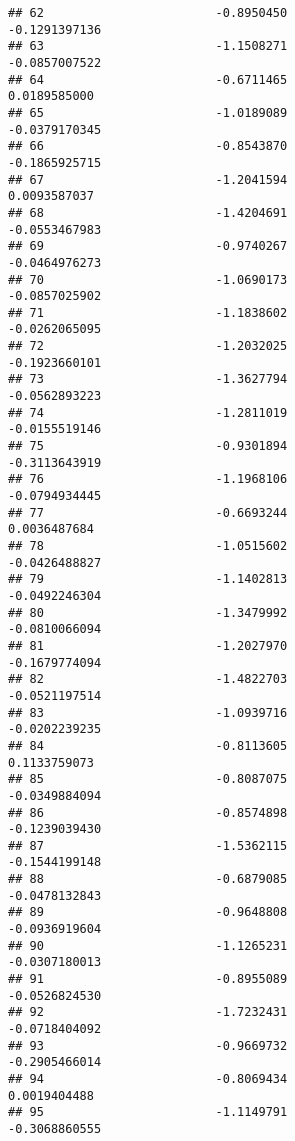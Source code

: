\documentclass[
]{article}
\begin{document}
\begin{verbatim}
## 62                        -0.8950450                         -0.1291397136
## 63                        -1.1508271                         -0.0857007522
## 64                        -0.6711465                          0.0189585000
## 65                        -1.0189089                         -0.0379170345
## 66                        -0.8543870                         -0.1865925715
## 67                        -1.2041594                          0.0093587037
## 68                        -1.4204691                         -0.0553467983
## 69                        -0.9740267                         -0.0464976273
## 70                        -1.0690173                         -0.0857025902
## 71                        -1.1838602                         -0.0262065095
## 72                        -1.2032025                         -0.1923660101
## 73                        -1.3627794                         -0.0562893223
## 74                        -1.2811019                         -0.0155519146
## 75                        -0.9301894                         -0.3113643919
## 76                        -1.1968106                         -0.0794934445
## 77                        -0.6693244                          0.0036487684
## 78                        -1.0515602                         -0.0426488827
## 79                        -1.1402813                         -0.0492246304
## 80                        -1.3479992                         -0.0810066094
## 81                        -1.2027970                         -0.1679774094
## 82                        -1.4822703                         -0.0521197514
## 83                        -1.0939716                         -0.0202239235
## 84                        -0.8113605                          0.1133759073
## 85                        -0.8087075                         -0.0349884094
## 86                        -0.8574898                         -0.1239039430
## 87                        -1.5362115                         -0.1544199148
## 88                        -0.6879085                         -0.0478132843
## 89                        -0.9648808                         -0.0936919604
## 90                        -1.1265231                         -0.0307180013
## 91                        -0.8955089                         -0.0526824530
## 92                        -1.7232431                         -0.0718404092
## 93                        -0.9669732                         -0.2905466014
## 94                        -0.8069434                          0.0019404488
## 95                        -1.1149791                         -0.3068860555

\end{verbatim}
\end{document}
